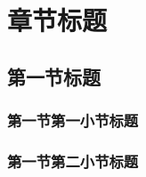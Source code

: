 \chapter{章节标题}\label{chapter2}
\vbox{}
\vbox{}
\section{第一节标题}\label{section21}
\vbox{}
\vbox{}
\subsection{第一节第一小节标题}\label{section211}
\vbox{}
\vbox{}
\subsection{第一节第二小节标题}\label{section212}
\vbox{}
\vbox{}






